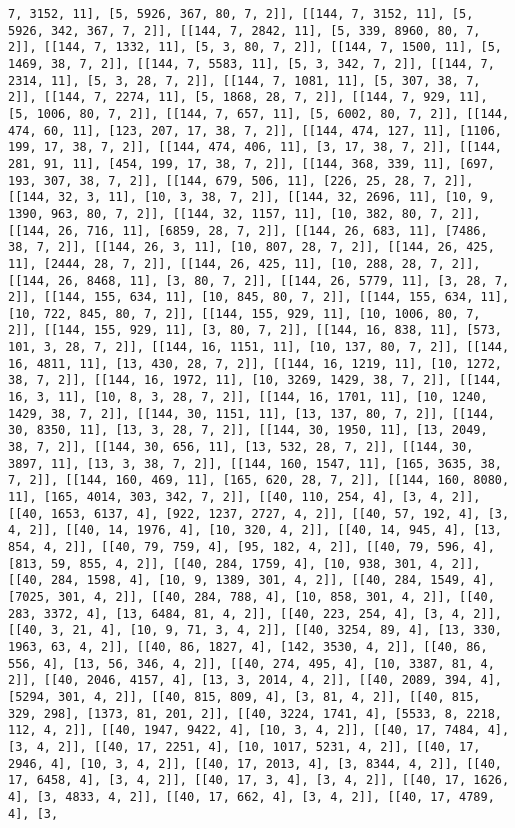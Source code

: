 \documentclass[12pt,fleqn]{article}\usepackage{../../common}
\begin{document}
\begin{verbatim}
7, 3152, 11], [5, 5926, 367, 80, 7, 2]], [[144, 7, 3152, 11], [5, 5926, 342, 367, 7, 2]], [[144, 7, 2842, 11], [5, 339, 8960, 80, 7, 2]], [[144, 7, 1332, 11], [5, 3, 80, 7, 2]], [[144, 7, 1500, 11], [5, 1469, 38, 7, 2]], [[144, 7, 5583, 11], [5, 3, 342, 7, 2]], [[144, 7, 2314, 11], [5, 3, 28, 7, 2]], [[144, 7, 1081, 11], [5, 307, 38, 7, 2]], [[144, 7, 2274, 11], [5, 1868, 28, 7, 2]], [[144, 7, 929, 11], [5, 1006, 80, 7, 2]], [[144, 7, 657, 11], [5, 6002, 80, 7, 2]], [[144, 474, 60, 11], [123, 207, 17, 38, 7, 2]], [[144, 474, 127, 11], [1106, 199, 17, 38, 7, 2]], [[144, 474, 406, 11], [3, 17, 38, 7, 2]], [[144, 281, 91, 11], [454, 199, 17, 38, 7, 2]], [[144, 368, 339, 11], [697, 193, 307, 38, 7, 2]], [[144, 679, 506, 11], [226, 25, 28, 7, 2]], [[144, 32, 3, 11], [10, 3, 38, 7, 2]], [[144, 32, 2696, 11], [10, 9, 1390, 963, 80, 7, 2]], [[144, 32, 1157, 11], [10, 382, 80, 7, 2]], [[144, 26, 716, 11], [6859, 28, 7, 2]], [[144, 26, 683, 11], [7486, 38, 7, 2]], [[144, 26, 3, 11], [10, 807, 28, 7, 2]], [[144, 26, 425, 11], [2444, 28, 7, 2]], [[144, 26, 425, 11], [10, 288, 28, 7, 2]], [[144, 26, 8468, 11], [3, 80, 7, 2]], [[144, 26, 5779, 11], [3, 28, 7, 2]], [[144, 155, 634, 11], [10, 845, 80, 7, 2]], [[144, 155, 634, 11], [10, 722, 845, 80, 7, 2]], [[144, 155, 929, 11], [10, 1006, 80, 7, 2]], [[144, 155, 929, 11], [3, 80, 7, 2]], [[144, 16, 838, 11], [573, 101, 3, 28, 7, 2]], [[144, 16, 1151, 11], [10, 137, 80, 7, 2]], [[144, 16, 4811, 11], [13, 430, 28, 7, 2]], [[144, 16, 1219, 11], [10, 1272, 38, 7, 2]], [[144, 16, 1972, 11], [10, 3269, 1429, 38, 7, 2]], [[144, 16, 3, 11], [10, 8, 3, 28, 7, 2]], [[144, 16, 1701, 11], [10, 1240, 1429, 38, 7, 2]], [[144, 30, 1151, 11], [13, 137, 80, 7, 2]], [[144, 30, 8350, 11], [13, 3, 28, 7, 2]], [[144, 30, 1950, 11], [13, 2049, 38, 7, 2]], [[144, 30, 656, 11], [13, 532, 28, 7, 2]], [[144, 30, 3897, 11], [13, 3, 38, 7, 2]], [[144, 160, 1547, 11], [165, 3635, 38, 7, 2]], [[144, 160, 469, 11], [165, 620, 28, 7, 2]], [[144, 160, 8080, 11], [165, 4014, 303, 342, 7, 2]], [[40, 110, 254, 4], [3, 4, 2]], [[40, 1653, 6137, 4], [922, 1237, 2727, 4, 2]], [[40, 57, 192, 4], [3, 4, 2]], [[40, 14, 1976, 4], [10, 320, 4, 2]], [[40, 14, 945, 4], [13, 854, 4, 2]], [[40, 79, 759, 4], [95, 182, 4, 2]], [[40, 79, 596, 4], [813, 59, 855, 4, 2]], [[40, 284, 1759, 4], [10, 938, 301, 4, 2]], [[40, 284, 1598, 4], [10, 9, 1389, 301, 4, 2]], [[40, 284, 1549, 4], [7025, 301, 4, 2]], [[40, 284, 788, 4], [10, 858, 301, 4, 2]], [[40, 283, 3372, 4], [13, 6484, 81, 4, 2]], [[40, 223, 254, 4], [3, 4, 2]], [[40, 3, 21, 4], [10, 9, 71, 3, 4, 2]], [[40, 3254, 89, 4], [13, 330, 1963, 63, 4, 2]], [[40, 86, 1827, 4], [142, 3530, 4, 2]], [[40, 86, 556, 4], [13, 56, 346, 4, 2]], [[40, 274, 495, 4], [10, 3387, 81, 4, 2]], [[40, 2046, 4157, 4], [13, 3, 2014, 4, 2]], [[40, 2089, 394, 4], [5294, 301, 4, 2]], [[40, 815, 809, 4], [3, 81, 4, 2]], [[40, 815, 329, 298], [1373, 81, 201, 2]], [[40, 3224, 1741, 4], [5533, 8, 2218, 112, 4, 2]], [[40, 1947, 9422, 4], [10, 3, 4, 2]], [[40, 17, 7484, 4], [3, 4, 2]], [[40, 17, 2251, 4], [10, 1017, 5231, 4, 2]], [[40, 17, 2946, 4], [10, 3, 4, 2]], [[40, 17, 2013, 4], [3, 8344, 4, 2]], [[40, 17, 6458, 4], [3, 4, 2]], [[40, 17, 3, 4], [3, 4, 2]], [[40, 17, 1626, 4], [3, 4833, 4, 2]], [[40, 17, 662, 4], [3, 4, 2]], [[40, 17, 4789, 4], [3, 
\end{verbatim}
\end{document}
